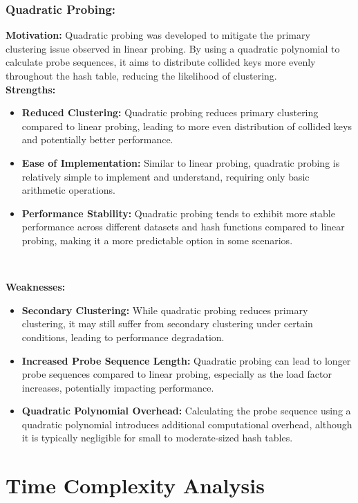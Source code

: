 \documentclass[12pt]{article}
\begin{document}
\subsubsection{Quadratic Probing:}
\textbf{Motivation:} Quadratic probing was developed to mitigate the primary clustering issue observed in linear probing. By using a quadratic polynomial to calculate probe sequences, it aims to distribute collided keys more evenly throughout the hash table, reducing the likelihood of clustering.
\ \\
\textbf{Strengths:}
\begin{itemize}
    \item \textbf{Reduced Clustering:} Quadratic probing reduces primary clustering compared to linear probing, leading to more even distribution of collided keys and potentially better performance.
    \item \textbf{Ease of Implementation:} Similar to linear probing, quadratic probing is relatively simple to implement and understand, requiring only basic arithmetic operations.
    \item \textbf{Performance Stability:} Quadratic probing tends to exhibit more stable performance across different datasets and hash functions compared to linear probing, making it a more predictable option in some scenarios.
\end{itemize}
\ \

\textbf{Weaknesses:}
\begin{itemize}
    \item \textbf{Secondary Clustering:} While quadratic probing reduces primary clustering, it may still suffer from secondary clustering under certain conditions, leading to performance degradation.
    \item \textbf{Increased Probe Sequence Length:} Quadratic probing can lead to longer probe sequences compared to linear probing, especially as the load factor increases, potentially impacting performance.
    \item \textbf{Quadratic Polynomial Overhead:} Calculating the probe sequence using a quadratic polynomial introduces additional computational overhead, although it is typically negligible for small to moderate-sized hash tables.
\end{itemize}



\section{Time Complexity Analysis}
\end{document}
